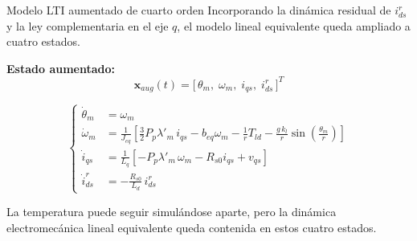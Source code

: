 \documentclass[aspectratio=169,t]{beamer}
\begin{document}
\begin{frame}{Modelo LTI aumentado de cuarto orden}
{\small\color{uncGray}Incorporando la dinámica residual de $i_{ds}^{r}$ y la ley complementaria en el eje $q$, el modelo lineal equivalente queda ampliado a cuatro estados.}\par
\vspace{2mm}

\textbf{Estado aumentado:}
\begin{equation*}
\bm{x}_{aug}(t)=\big[\,\theta_m,\;\omega_m,\;i_{qs},\;i_{ds}^{r}\,\big]^T
\end{equation*}

\footnotesize
\begin{equation*}
\left\{
\begin{aligned}
\dot{\theta}_m &= \omega_m \\[2pt]
\dot{\omega}_m &= \frac{1}{J_{eq}}\!\left[\frac{3}{2}P_p\lambda'_m\,i_{qs}-b_{eq}\omega_m-\frac{1}{r}T_{ld}-\frac{g\,k_l}{r}\sin\!\left(\frac{\theta_m}{r}\right)\right] \\[4pt]
\dot{i}_{qs} &= \frac{1}{L_q}\!\left[-P_p\lambda'_m\,\omega_m-R_{s0}i_{qs}+v_{qs}\right] \\[4pt]
\dot{i}_{ds}^{r} &= -\frac{R_{s0}}{L_d}\,i_{ds}^{r}
\end{aligned}
\right.
\end{equation*}
\normalsize

{\small La temperatura puede seguir simulándose aparte, pero la dinámica electromecánica lineal equivalente queda contenida en estos cuatro estados.}
\end{frame}
\end{document}
